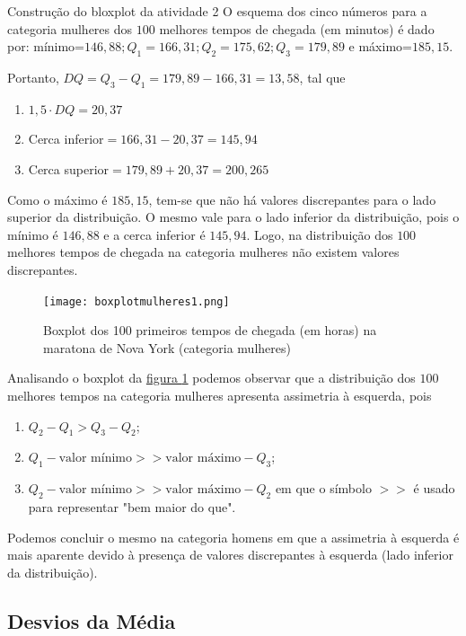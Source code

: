 \begin{example}{Construção do bloxplot da atividade 2}
O esquema dos cinco números para a categoria mulheres dos $100$ melhores tempos de chegada (em minutos) é dado por: mínimo=$146,88; Q_1=166,31; Q_2=175,62; Q_3=179,89$ e máximo=$185,15$.

Portanto, $DQ=Q_3-Q_1=179{,}89-166{,}31=13{,}58$, tal que
\begin{enumerate}
\item $1{,}5\cdot DQ=20{,}37$
\item Cerca inferior$=166{,}31-20{,}37=145{,}94$
\item Cerca superior$=179{,}89+20{,}37=200{,}265$
\end{enumerate}

Como o máximo é $185{,}15$, tem-se que não há valores discrepantes para o lado superior da distribuição. O mesmo vale para o lado inferior da distribuição, pois o mínimo é $146{,}88$ e a cerca inferior é $145{,}94$. Logo, na distribuição dos $100$ melhores tempos de chegada na categoria mulheres não existem valores discrepantes.

\begin{figure}[H]
\centering

\texttt{[image: boxplotmulheres1.png]}
\caption{Boxplot dos 100 primeiros tempos de chegada (em horas) na maratona de Nova York (categoria mulheres)}
\label{boxplotmulheres1}
\end{figure}

Analisando o boxplot da \hyperref[boxplotmulheres1]{figura \ref{boxplotmulheres1}} podemos observar que a distribuição dos $100$ melhores tempos na categoria mulheres apresenta assimetria à esquerda, pois

\begin{enumerate}
\item $Q_2-Q_1>Q_3-Q_2$;
\item $Q_1-\text{valor mínimo}>>\text{valor máximo}-Q_3$;
\item $Q_2-\text{valor mínimo}>>\text{valor máximo}-Q_2$ em que o símbolo $>>$ é usado para representar "bem maior do que".
\end{enumerate}

Podemos concluir o mesmo na categoria homens em que a assimetria à esquerda é mais aparente devido à presença de valores discrepantes à esquerda (lado inferior da distribuição).
\end{example}

\subsection{Desvios da Média}

